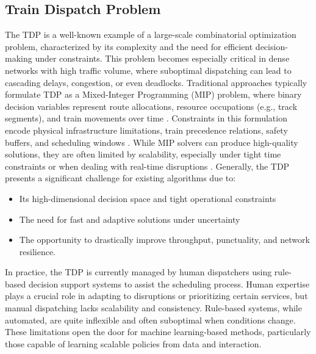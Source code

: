 \documentclass[runningheads]{llncs}
\begin{document}
\subsection{Train Dispatch Problem}
\label{sss:train}
The TDP is a well-known example of a large-scale combinatorial optimization problem, characterized by its complexity and the need for efficient decision-making under constraints. 
This problem becomes especially critical in dense networks with high traffic volume, where suboptimal dispatching can lead to cascading delays, congestion, or even deadlocks.
Traditional approaches typically formulate TDP as a Mixed-Integer Programming (MIP) problem, where binary decision variables represent route allocations, resource occupations (e.g., track segments), and train movements over time \cite{train:doi:10.1287/opre.2014.1327}. 
Constraints in this formulation encode physical infrastructure limitations, train precedence relations, safety buffers, and scheduling windows \cite{train:LAMORGESE2013559}. 
While MIP solvers can produce high-quality solutions, they are often limited by scalability, especially under tight time constraints or when dealing with real-time disruptions \cite{train:Sch_licke_2025}.
Generally, the TDP presents a significant challenge for existing algorithms due to: \begin{itemize} \item Its high-dimensional decision space and tight operational constraints \item The need for fast and adaptive solutions under uncertainty \item The opportunity to drastically improve throughput, punctuality, and network resilience. \end{itemize}

In practice, the TDP is currently managed by human dispatchers using rule-based decision support systems to assist the scheduling process. 
Human expertise plays a crucial role in adapting to disruptions or prioritizing certain services, but manual dispatching lacks scalability and consistency. 
Rule-based systems, while automated, are quite inflexible and often suboptimal when conditions change. 
These limitations open the door for machine learning-based methods, particularly those capable of learning scalable policies from data and interaction.
\end{document}
